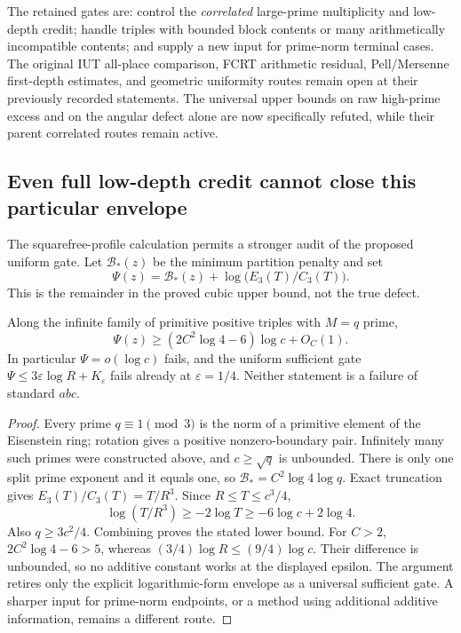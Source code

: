 The retained gates are: control the \emph{correlated} large-prime multiplicity
and low-depth credit; handle triples with bounded block contents or many
arithmetically incompatible contents; and supply a new input for prime-norm
terminal cases. The original IUT all-place comparison, FCRT arithmetic residual,
Pell/Mersenne first-depth estimates, and geometric uniformity routes remain
open at their previously recorded statements. The universal upper bounds on
raw high-prime excess and on the angular defect alone are now specifically
refuted, while their parent correlated routes remain active.

\subsection{Even full low-depth credit cannot close this particular envelope}
\label{sec:ep-envelope-limit}
The squarefree-profile calculation permits a stronger audit of the proposed
uniform gate. Let $\mathcal B_*(z)$ be the minimum partition penalty and set
\[
 \Psi(z)=\mathcal B_*(z)+\log\bigl(E_3(T)/C_3(T)\bigr).
\]
This is the remainder in the proved cubic upper bound, not the true defect.

\begin{proposition}
\label{prop:ep-envelope-no-go}
Along the infinite family of primitive positive triples with $M=q$ prime,
\[
 \Psi(z)\ge (2C^2\log4-6)\log c+O_C(1).
\]
In particular $\Psi=o(\log c)$ fails, and the uniform sufficient gate
$\Psi\le3\varepsilon\log R+K_\varepsilon$ fails already at
$\varepsilon=1/4$. Neither statement is a failure of standard $abc$.
\end{proposition}
\begin{proof}
Every prime $q\equiv1\pmod3$ is the norm of a primitive element of the
Eisenstein ring; rotation gives a positive nonzero-boundary pair. Infinitely
many such primes were constructed above, and $c\ge\sqrt q$ is unbounded.
There is only one split prime exponent and it equals one, so
$\mathcal B_*=C^2\log4\log q$. Exact truncation gives
$E_3(T)/C_3(T)=T/R^3$. Since $R\le T\le c^3/4$,
\[
 \log(T/R^3)\ge-2\log T\ge-6\log c+2\log4.
\]
Also $q\ge3c^2/4$. Combining proves the stated lower bound. For $C>2$,
$2C^2\log4-6>5$, whereas $(3/4)\log R\le(9/4)\log c$.
Their difference is unbounded, so no additive constant works at the displayed
epsilon. The argument retires only the explicit logarithmic-form envelope
as a universal sufficient gate. A sharper input for prime-norm endpoints,
or a method using additional additive information, remains a different route.
\end{proof}
